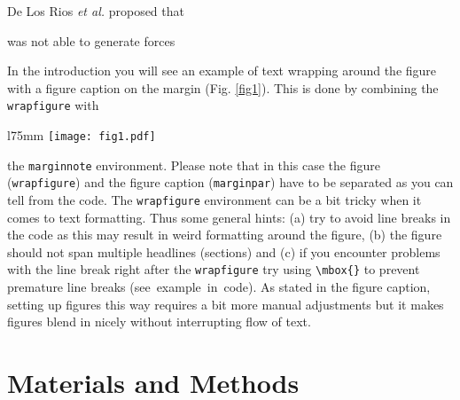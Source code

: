 \documentclass[10pt,letterpaper]{article}
\begin{document}
De Los Rios \textit{et al.} proposed that

was not able to generate forces



In the introduction you will see an example of text wrapping around the figure with a figure caption on the margin (Fig. \ref{fig1}). This is done by combining the \verb!wrapfigure! with %
\begin{wrapfigure}[19]{l}{75mm}
\texttt{[image: fig1.pdf]}
\captionsetup{labelformat=empty} %
\caption{} %
\label{fig1} %
\end{wrapfigure} %
the \verb!marginnote! environment. Please note that in this case the figure (\verb!wrapfigure!) and the figure caption (\verb!marginpar!) have to be separated as you can tell from the code. The \verb!wrapfigure! environment can be a bit tricky when it comes to text formatting. Thus some general hints: (a) try to avoid line breaks in the code as this may result in weird formatting around the figure, (b) the figure should not span multiple headlines (sections) and (c) if you encounter problems with the line break right after the \verb!wrapfigure! try using \verb!\mbox{}! to prevent premature line breaks (\mbox{see example in code}). As stated in the figure caption, setting up figures this way requires a bit more manual adjustments but it makes figures blend in nicely without interrupting flow of text.

\section*{Materials and Methods}
\end{document}
